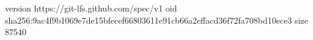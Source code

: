 version https://git-lfs.github.com/spec/v1
oid sha256:9ac4f9b1069e7de15bfecef66803611e91cb66a2effacd36f72fa708bd10ece3
size 87540
